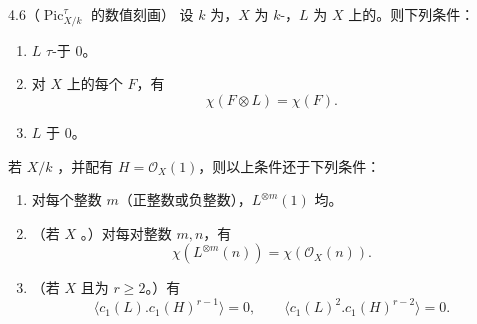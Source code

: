 \begin{SGAresult}{}{4.6（$\operatorname{Pic}^\tau_{X/k}$ 的数值刻画）}
设 $k$ 为，$X$ 为 $k$-，$L$ 为 $X$ 上的。则下列条件：
\begin{enumerate}
\item[(i)] $L$ $\tau$-于 $0$。
\item[(ii)] 对 $X$ 上的每个 $F$，有
\[\chi(F\otimes L)=\chi(F).\]
\item[(iii)] $L$ 于 $0$。
\end{enumerate}
若 $X/k$ ，并配有 $H=\mathscr O_X(1)$，则以上条件还于下列条件：
\begin{enumerate}
\item[(iv)] 对每个整数 $m$（正整数或负整数），$L^{\otimes m}(1)$ 均。
\item[(v)] （若 $X$ 。）对每对整数 $m,n$，有
\[\chi(L^{\otimes m}(n))=\chi(\mathscr O_X(n)).\]
\item[(vi)] （若 $X$ 且为 $r\geq2$。）有
\[\langle c_1(L).c_1(H)^{r-1}\rangle=0,\qquad
\langle c_1(L)^2.c_1(H)^{r-2}\rangle=0.\]
\end{enumerate}
\end{SGAresult}
